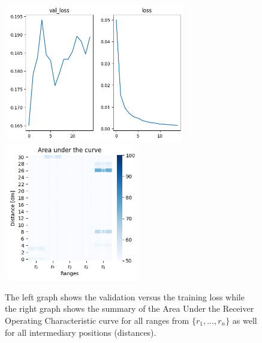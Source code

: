 \begin{multicols}{2}
\end{multicols}\begin{figure}[H]%
\centering
\includegraphics[width=8cm,height=6cm]{3_models/models_17/graph_17.png}
\hspace{0.2 cm}
\includegraphics[width=6cm,height=6cm]{4_plots/plots_17/AUC_17.png}
\caption{The left graph shows the validation versus the training loss while the right graph shows the summary of the Area Under the Receiver Operating Characteristic curve for all ranges from $\{r_{1}, ... ,r_{n}\}$ as well for all intermediary positions (distances).}
\label{auc_17}
\end{figure}



\newpage
